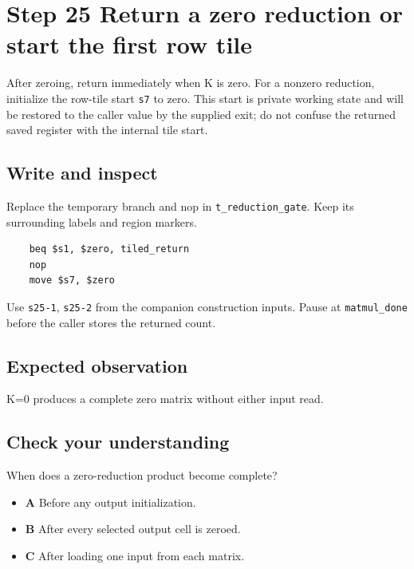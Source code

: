 \section{Step 25 Return a zero reduction or start the first row tile}\label{matmul-s25}

After zeroing, return immediately when K is zero. For a nonzero reduction, initialize the row-tile start \texttt{s7} to zero. This start is private working state and will be restored to the caller value by the supplied exit; do not confuse the returned saved register with the internal tile start.

\subsection{Write and inspect}
Replace the temporary branch and nop in \texttt{t\_reduction\_gate}. Keep its surrounding labels and region markers.

\begin{verbatim}
    beq $s1, $zero, tiled_return
    nop
    move $s7, $zero
\end{verbatim}
Use \texttt{s25-1}, \texttt{s25-2} from the companion construction inputs. Pause at \texttt{matmul\_done} before the caller stores the returned count.

\subsection{Expected observation}
K=0 produces a complete zero matrix without either input read.

\subsection{Check your understanding}
When does a zero-reduction product become complete?

\begin{itemize}
  \item \textbf{A} Before any output initialization.
  \item \textbf{B} After every selected output cell is zeroed.
  \item \textbf{C} After loading one input from each matrix.
\end{itemize}
